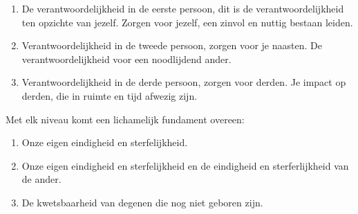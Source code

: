 \documentclass[11pt,a4paper,titlepage]{article}
\begin{document}
\begin{enumerate}
\item De verantwoordelijkheid in de eerste persoon, dit is de verantwoordelijkheid ten opzichte van jezelf. Zorgen voor jezelf, een zinvol en nuttig bestaan leiden.
\item Verantwoordelijkheid in de tweede persoon, zorgen voor je naasten. De verantwoordelijkheid voor een noodlijdend ander.
\item Verantwoordelijkheid in de derde persoon, zorgen voor derden. Je impact op derden, die in ruimte en tijd afwezig zijn.
\end{enumerate}
Met elk niveau komt een lichamelijk fundament overeen:
\begin{enumerate}
\item Onze eigen eindigheid en sterfelijkheid.
\item Onze eigen eindigheid en sterfelijkheid en de eindigheid en sterferlijkheid van de ander.
\item De kwetsbaarheid van degenen die nog niet geboren zijn.
\end{enumerate}
\end{document}
